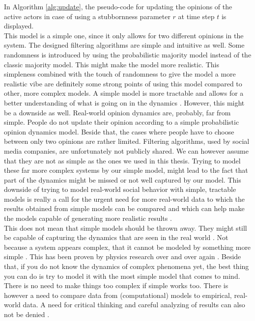 \documentclass[11 pt , letterpaper , twoside , openright]{book}
\begin{document}
\newline
In Algorithm \ref{alg:update}, the pseudo-code for updating the opinions of the active actors in case of using a stubbornness parameter $r$ at time step $t$ is displayed. \\
\newline
This model is a simple one, since it only allows for two different opinions in the system. The designed filtering algorithms are simple and intuitive as well. Some randomness is introduced by using the probabilistic majority model instead of the classic majority model. This might make the model more realistic. This simpleness combined with the touch of randomness to give the model a more realistic vibe are definitely some strong points of using this model compared to other, more complex models. A simple model is more tractable and allows for a better understanding of what is going on in the dynamics \cite{Jed2019}. However, this might be a downside as well. Real-world opinion dynamics are, probably, far from simple. People do not update their opinion according to a simple probabilistic opinion dynamics model. Beside that, the cases where people have to choose between only two opinions are rather limited. Filtering algorithms, used by social media companies, are unfortunately not publicly shared. We can however assume that they are not as simple as the ones we used in this thesis. Trying to model these far more complex systems by our simple model, might lead to the fact that part of the dynamics might be missed or not well captured by our model. This downside of trying to model real-world social behavior with simple, tractable models is really a call for the urgent need for more real-world data to which the results obtained from simple models can be compared and which can help make the models capable of generating more realistic results \cite{Castellano2009}\cite{Pawel}. \\
\newline
This does not mean that simple models should be thrown away. They might still be capable of capturing the dynamics that are seen in the real world \cite{Gug2015}. Not because a system appears complex, that it cannot be modeled by something more simple \cite{Jed2019}. This has been proven by physics research over and over again \cite{Gug2015}. Beside that, if you do not know the dynamics of complex phenomena yet, the best thing you can do is try to model it with the most simple model that comes to mind. There is no need to make things too complex if simple works too. There is however a need to compare data from (computational) models to empirical, real-world data. A need for critical thinking and careful analyzing of results can also not be denied \cite{Pawel}.
\end{document}
